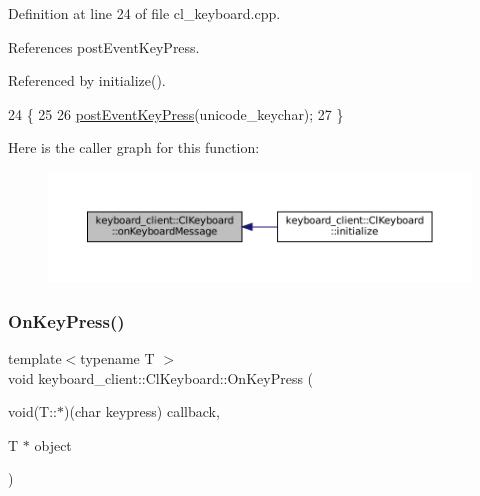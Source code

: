 Definition at line 24 of file cl\+\_\+keyboard.\+cpp.



References post\+Event\+Key\+Press.



Referenced by initialize().


\begin{DoxyCode}
24                                                                         \{
25   
26   \hyperlink{classkeyboard__client_1_1ClKeyboard_aadd675eea47a012b348a4e6c00e7e9d0}{postEventKeyPress}(unicode\_keychar);
27 \}
\end{DoxyCode}
Here is the caller graph for this function\+:
\nopagebreak
\begin{figure}[H]
\begin{center}
\leavevmode
\includegraphics[width=350pt]{classkeyboard__client_1_1ClKeyboard_adbfb9c2b98f784b12cf7740b4e861d8e_icgraph}
\end{center}
\end{figure}
\mbox{\label{classkeyboard__client_1_1ClKeyboard_a09581faae1ada2cdd53010ebb9a2197a}} 
\subsubsection{\texorpdfstring{On\+Key\+Press()}{OnKeyPress()}}
{\footnotesize\ttfamily template$<$typename T $>$ \\
void keyboard\+\_\+client\+::\+Cl\+Keyboard\+::\+On\+Key\+Press (\begin{DoxyParamCaption}\item[{void(T\+::$\ast$)(char keypress)}]{callback,  }\item[{T $\ast$}]{object }\end{DoxyParamCaption})\hspace{0.3cm}{\ttfamily [inline]}}



